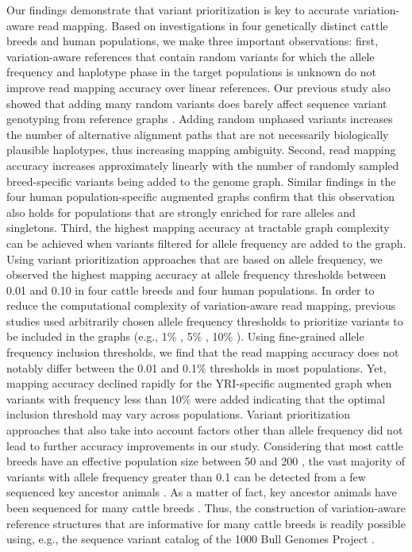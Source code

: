 \documentclass[../main.tex]{subfiles}
\begin{document}
Our findings demonstrate that variant prioritization is key to accurate variation-aware read mapping. Based on investigations in four genetically distinct cattle breeds and human populations, we make three important observations: first, variation-aware references that contain random variants for which the allele frequency and haplotype phase in the target populations is unknown do not improve read mapping accuracy over linear references. Our previous study also showed that adding many random variants does barely affect sequence variant genotyping from reference graphs \citep{crysnanto2019accurate}. Adding random unphased variants increases the number of alternative alignment paths that are not necessarily biologically plausible haplotypes, thus increasing mapping ambiguity. Second, read mapping accuracy increases approximately linearly with the number of randomly sampled breed-specific variants being added to the genome graph. Similar findings in the four human population-specific augmented graphs confirm that this observation also holds for populations that are strongly enriched for rare alleles and singletons. Third, the highest mapping accuracy at tractable graph complexity can be achieved when variants filtered for allele frequency are added to the graph. Using variant prioritization approaches that are based on allele frequency, we observed the highest mapping accuracy at allele frequency thresholds between 0.01 and 0.10 in four cattle breeds and four human populations. In order to reduce the computational complexity of variation-aware read mapping, previous studies used arbitrarily chosen allele frequency thresholds to prioritize variants to be included in the graphs (e.g., 1\% \citep{garrison2018variation,eggertsson2017graphtyper}, 5\% \citep{maciuca2016natural}, 10\% \citep{kim2019graph}). Using fine-grained allele frequency inclusion thresholds, we find that the read mapping accuracy does not notably differ between the 0.01 and 0.1\% thresholds in most populations. Yet, mapping accuracy declined rapidly for the YRI-specific augmented graph when variants with frequency less than 10\% were added indicating that the optimal inclusion threshold may vary across populations. Variant prioritization approaches that also take into account factors other than allele frequency \citep{pritt2018forge} did not lead to further accuracy improvements in our study. Considering that most cattle breeds have an effective population size between 50 and 200 \citep{hall2016effective,leroy2013methods}, the vast majority of variants with allele frequency greater than 0.1 can be detected from a few sequenced key ancestor animals \citep{jansen2013assessment}. As a matter of fact, key ancestor animals have been sequenced for many cattle breeds \citep{daetwyler2014whole,bouwman2018meta}. Thus, the construction of variation-aware reference structures that are informative for many cattle breeds is readily possible using, e.g., the sequence variant catalog of the 1000 Bull Genomes Project \citep{daetwyler2014whole,hayes20191000}.
\end{document}
